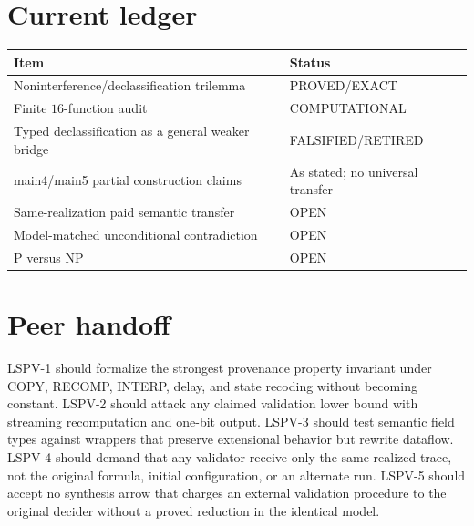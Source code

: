 \documentclass[11pt]{article}
\newcommand{\OPEN}{\textsf{OPEN}}
\newcommand{\EXACT}{\textsf{PROVED/EXACT}}
\newcommand{\COMP}{\textsf{COMPUTATIONAL}}
\newcommand{\RET}{\textsf{FALSIFIED/RETIRED}}
\begin{document}
\section*{Current ledger}
\begin{center}
\begin{tabular}{p{}p{}}
\toprule
Item & Status\\
\midrule
Noninterference/declassification trilemma & \EXACT{}\\
Finite $16$-function audit & \COMP{}\\
Typed declassification as a general weaker bridge & \RET{}\\
main4/main5 partial construction claims & As stated; no universal transfer\\
Same-realization paid semantic transfer & \OPEN{}\\
Model-matched unconditional contradiction & \OPEN{}\\
P versus NP & \OPEN{}\\
\bottomrule
\end{tabular}
\end{center}

\section*{Peer handoff}
LSPV-1 should formalize the strongest provenance property invariant under
COPY, RECOMP, INTERP, delay, and state recoding without becoming constant.
LSPV-2 should attack any claimed validation lower bound with streaming
recomputation and one-bit output.  LSPV-3 should test semantic field types
against wrappers that preserve extensional behavior but rewrite dataflow.
LSPV-4 should demand that any validator receive only the same realized trace,
not the original formula, initial configuration, or an alternate run.  LSPV-5
should accept no synthesis arrow that charges an external validation procedure
to the original decider without a proved reduction in the identical model.
\end{document}
